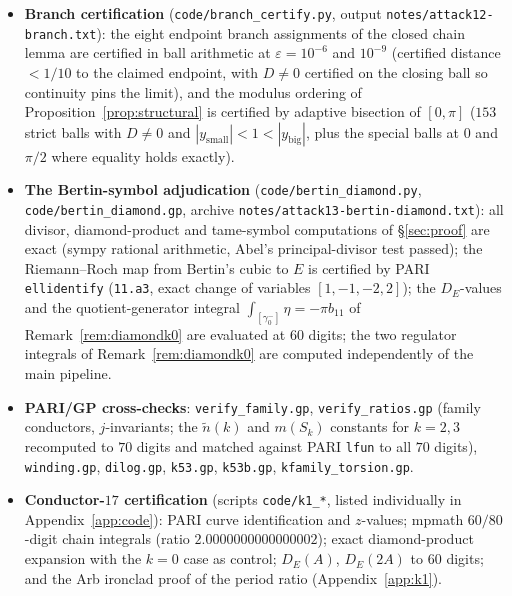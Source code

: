 \documentclass[11pt]{amsart}
\theoremstyle{definition}
\theoremstyle{remark}
\begin{document}
\begin{itemize}
  constant $\kappa=1$ is an \emph{exact rational identity}
  (\texttt{code/kappa\_exact.py}): an explicit birational map to the minimal
  model, derived by Riemann--Roch and composed with PARI's exact minimal
  transform, satisfies $2Y+1=u\,dX/dx$ as a polynomial identity, hence
  $\omega_{\min}=dX/(2Y+1)=dx/u$ exactly (sympy-verified, including the
  inverse round-trip).
  \item \textbf{Branch certification} (\texttt{code/branch\_certify.py},
  output \texttt{notes/attack12-branch.txt}): the eight endpoint branch
  assignments of the closed chain lemma are certified in ball arithmetic at
  $\varepsilon=10^{-6}$ and $10^{-9}$ (certified distance $<1/10$ to the
  claimed endpoint, with $D\ne0$ certified on the closing ball so continuity
  pins the limit), and the modulus ordering of
  Proposition~\ref{prop:structural} is certified by adaptive bisection of
  $[0,\pi]$ ($153$ strict balls with $D\ne0$ and
  $|y_{\mathrm{small}}|<1<|y_{\mathrm{big}}|$, plus the special balls at $0$
  and $\pi/2$ where equality holds exactly).
  \item \textbf{The Bertin-symbol adjudication} (\texttt{code/bertin\_diamond.py},
  \texttt{code/bertin\_diamond.gp}, archive
  \texttt{notes/attack13-bertin-diamond.txt}):
  \begingroup\sloppy
  all divisor, diamond-product
  and tame-symbol computations of \S\ref{sec:proof} are exact (sympy rational
  arithmetic, Abel's principal-divisor test passed); the Riemann--Roch map
  from Bertin's cubic to $E$ is certified by PARI \texttt{ellidentify}
  (\texttt{11.a3}, exact change of variables $[1,-1,-2,2]$); the $D_E$-values
  and the quotient-generator integral $\int_{[\gamma^-_0]}\eta=-\pi b_{11}$
  of Remark~\ref{rem:diamondk0} are evaluated at $60$ digits; the
  two regulator integrals of Remark~\ref{rem:diamondk0} are computed
  independently of the main pipeline.
  \par\endgroup
  \item \textbf{PARI/GP cross-checks}: \texttt{verify\_family.gp},
  \texttt{verify\_ratios.gp} (family conductors, $j$-invariants; the
  $\tilde n(k)$ and $m(S_k)$ constants for $k=2,3$ recomputed to $70$ digits
  and matched against PARI \texttt{lfun} to all $70$ digits), \texttt{winding.gp},
  \texttt{dilog.gp}, \texttt{k53.gp}, \texttt{k53b.gp},
  \texttt{kfamily\_torsion.gp}.
  \item \textbf{Conductor-$17$ certification} (scripts \texttt{code/k1\_*},
  listed individually in Appendix~\ref{app:code}): PARI curve identification
  and $z$-values; mpmath $60/80$-digit chain integrals (ratio
  $2.0000000000000002$); exact diamond-product expansion with the $k=0$ case
  as control; $D_E(A)$, $D_E(2A)$ to $60$ digits; and the Arb ironclad proof
  of the period ratio (Appendix~\ref{app:k1}).
\end{itemize}
\end{document}
